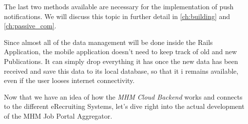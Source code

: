 The last two methods available are necessary for the implementation of push notifications. We will discuss this topic in further detail in \autoref{ch:building} and \autoref{ch:passive_com}.

Since almost all of the data management will be done inside the Rails Application, the mobile application doesn't need to keep track of old and new Publications. It can simply drop everything it has once the new data has been received and save this data to its local database, so that it i remains available, even if the user looses internet connectivity.

Now that we have an idea of how the \textit{MHM Cloud Backend} works and connects to the different eRecruiting Systems, let's dive right into the actual development of the MHM Job Portal Aggregator.




